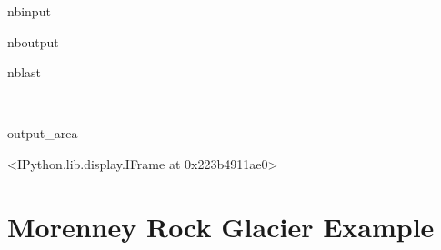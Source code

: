 \documentclass[letterpaper,10pt,english]{sphinxmanual}
\begin{document}
\begin{sphinxuseclass}{nbinput}
{
\begin{sphinxVerbatim}[commandchars=\\\{\}]
\llap{\color{nbsphinxin}[16]:\,\hspace{\fboxrule}\hspace{\fboxsep}}
                                    
\end{sphinxVerbatim}
}

\end{sphinxuseclass}
\begin{sphinxuseclass}{nboutput}
\begin{sphinxuseclass}{nblast}
{

\kern-\sphinxverbatimsmallskipamount\kern-\baselineskip
\kern+\FrameHeightAdjust\kern-\fboxrule
\vspace{\nbsphinxcodecellspacing}

\begin{sphinxuseclass}{output_area}
\begin{sphinxuseclass}{}


\begin{sphinxVerbatim}[commandchars=\\\{\}]
<IPython.lib.display.IFrame at 0x223b4911ae0>
\end{sphinxVerbatim}



\end{sphinxuseclass}
\end{sphinxuseclass}
}

\end{sphinxuseclass}
\end{sphinxuseclass}
\sphinxstepscope


\section{Morenney Rock Glacier Example}
\label{\detokenize{notebooks/MudCreek_Landslide_optical:Morenney-Rock-Glacier-Example}}\label{\detokenize{notebooks/MudCreek_Landslide_optical::doc}}
\end{document}

